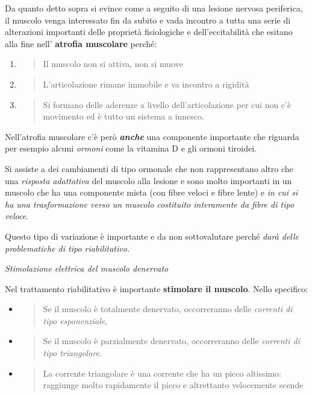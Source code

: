 \documentclass[]{article}
\begin{document}
Da quanto detto sopra si evince come a seguito di una lesione nervosa
periferica, il muscolo venga interessato fin da subito e vada incontro a
tutta una serie di alterazioni importanti delle proprietà fisiologiche e
dell'eccitabilità che esitano alla fine nell' \textbf{atrofia muscolare}
perché:

\begin{enumerate}
\def\labelenumi{\arabic{enumi}.}
\item
  \begin{quote}
  Il muscolo non si attiva, non si muove
  \end{quote}
\item
  \begin{quote}
  L'articolazione rimane immobile e va incontro a rigidità
  \end{quote}
\item
  \begin{quote}
  Si formano delle aderenze a livello dell'articolazione per cui non c'è
  movimento ed è tutto un sistema a innesco.
  \end{quote}
\end{enumerate}

Nell'atrofia muscolare c'è però \textbf{\emph{anche}} una componente
importante che riguarda per esempio alcuni \emph{ormoni} come la
vitamina D e gli ormoni tiroidei.

Si assiste a dei cambiamenti di tipo ormonale che non rappresentano
altro che una \emph{risposta adattativa} del muscolo alla lesione e sono
molto importanti in un muscolo che ha una componente mista (con fibre
veloci e fibre lente) e \emph{in cui si ha una trasformazione verso un
muscolo costituito interamente da fibre di tipo veloce. }

Questo tipo di variazione è importante e da non sottovalutare perché
\emph{darà delle problematiche di tipo riabilitativo.}

\emph{Stimolazione elettrica del muscolo denervato}

Nel trattamento riabilitativo è importante \textbf{stimolare il
muscolo}. Nello specifico:

\begin{itemize}
\item
  \begin{quote}
  Se il muscolo è totalmente denervato, occorreranno delle
  \emph{correnti di tipo esponenziale},
  \end{quote}
\item
  \begin{quote}
  Se il muscolo è parzialmente denervato, occorreranno delle
  \emph{correnti di tipo triangolare}.
  \end{quote}
\item
  \begin{quote}
  La corrente triangolare è una corrente che ha un picco altissimo:
  raggiunge molto rapidamente il picco e altrettanto velocemente scende
  \end{quote}
\end{itemize}
\end{document}
